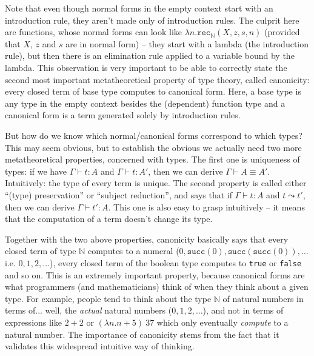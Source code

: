 \documentclass[declaration,mgr,english,shortabstract]{iithesis}
\newcommand{\m}[1]{\texttt{#1}}
\newcommand{\typeconv}[3]{#1 \vdash #2 \equiv #3}
\newcommand{\term}[3]{#1 \vdash #2 : #3}
\newcommand{\N}{\mathbb{N}}
\newcommand{\suc}[1]{\m{succ}(#1)}
\newcommand{\recN}[4]{\m{rec}_\N(#1, #2, #3, #4)}
\begin{document}
Note that even though normal forms in the empty context start with an introduction rule, they aren't made only of introduction rules. The culprit here are functions, whose normal forms can look like $\lambda n. \recN{X}{z}{s}{n}$ (provided that $X$, $z$ and $s$ are in normal form) -- they start with a lambda (the introduction rule), but then there is an elimination rule applied to a variable bound by the lambda. This observation is very important to be able to correctly state the second most important metatheoretical property of type theory, called canonicity: every closed term of base type computes to canonical form. Here, a base type is any type in the empty context besides the (dependent) function type and a canonical form is a term generated solely by introduction rules.

But how do we know which normal/canonical forms correspond to which types? This may seem obvious, but to establish the obvious we actually need two more metatheoretical properties, concerned with types. The first one is uniqueness of types: if we have $\term{\Gamma}{t}{A}$ and $\term{\Gamma}{t}{A'}$, then we can derive $\typeconv{\Gamma}{A}{A'}$. Intuitively: the type of every term is unique. The second property is called either  ``(type) preservation'' or ``subject reduction'', and says that if $\term{\Gamma}{t}{A}$ and $t \leadsto t'$, then we can derive $\term{\Gamma}{t'}{A}$. This one is also easy to grasp intuitively -- it means that the computation of a term doesn't change its type.

Together with the two above properties, canonicity basically says that every closed term of type $\N$ computes to a numeral ($0, \suc{0}, \suc{\suc{0}}, \dots$ i.e. $0, 1, 2, \dots$), every closed term of the boolean type computes to \m{true} or \m{false} and so on. This is an extremely important property, because canonical forms are what programmers (and mathematicians) think of when they think about a given type. For example, people tend to think about the type $\N$ of natural numbers in terms of... well, the \textit{actual} natural numbers ($0, 1, 2, \dots$), and not in terms of expressions like $2 + 2$ or $(\lambda n. n + 5)\ 37$ which only eventually \textit{compute} to a natural number. The importance of canonicity stems from the fact that it validates this widespread intuitive way of thinking.
\end{document}
